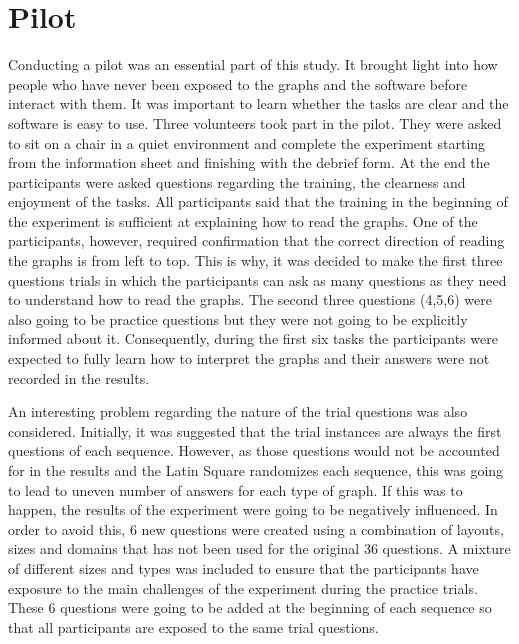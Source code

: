 \documentclass{l4proj}
\begin{document}
\section{Pilot}

Conducting a pilot was an essential part of this study. It brought light into how people who have never been exposed to the graphs and the software before interact with them. It was important to learn whether the tasks are clear and the software is easy to use. Three volunteers took part in the pilot. They were asked to sit on a chair in a quiet environment and complete the experiment starting from the information sheet and finishing with the debrief form. At the end the participants were asked questions regarding the training, the clearness and enjoyment of the tasks. All participants said that the training in the beginning of the experiment is sufficient at explaining how to read the graphs. One of the participants, however, required confirmation that the correct direction of reading the graphs is from left to top. This is why, it was decided to make the first three questions trials in which the participants can ask as many questions as they need to understand how to read the graphs. The second three questions (4,5,6) were also going to be practice questions but they were not going to be explicitly informed about it. Consequently, during the first six tasks the participants were expected to fully learn how to interpret the graphs and their answers were not recorded in the results. 

An interesting problem regarding the nature of the trial questions was also considered. Initially, it was suggested that the trial instances are always the first questions of each sequence. However, as those questions would not be accounted for in the results and the Latin Square randomizes each sequence, this was going to lead to uneven number of answers for each type of graph. If this was to happen, the results of the experiment were going to be negatively influenced. In order to avoid this, 6 new questions were created using a combination of layouts, sizes and domains that has not been used for the original 36 questions. A mixture of different sizes and types was included to ensure that the participants have exposure to the main challenges of the experiment during the practice trials. These 6 questions were going to be added at the beginning of each sequence so that all participants are exposed to the same trial questions.  
\end{document}
